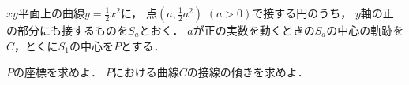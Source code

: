 \documentclass[../../main.tex]{subfiles}
\begin{document}
$xy$平面上の曲線$\displaystyle y=\frac{1}{2}x^2$に，
点$\displaystyle \left( a, \frac{1}{2}a^2 \right)$ $(a>0)$で接する円のうち，
$y$軸の正の部分にも接するものを$S_a$とおく．
$a$が正の実数を動くときの$S_a$の中心の軌跡を$C$，とくに$S_1$の中心を$P$とする．
\begin{enumerate}
  $P$の座標を求めよ．
  $P$における曲線$C$の接線の傾きを求めよ．
\end{enumerate}
\end{document}
